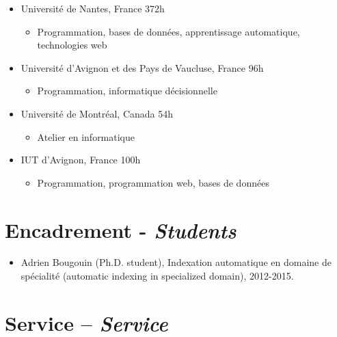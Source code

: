 \documentclass[11pt,a4paper]{moderncv}
\begin{document}
\begin{itemize}[leftmargin=0.5cm,itemsep=-0.2cm]
    \item Université de Nantes, France \hfill 372h
    \vspace*{-0.3cm}
    \begin{itemize}
        \item Programmation, bases de données, apprentissage automatique, 
              technologies web
    \end{itemize}
    \item Université d'Avignon et des Pays de Vaucluse, France \hfill 96h
    \vspace*{-0.3cm}
    \begin{itemize}
        \item Programmation, informatique décisionnelle 
    \end{itemize}
    \item Université de Montréal, Canada \hfill 54h
    \vspace*{-0.3cm}
    \begin{itemize}
        \item Atelier en informatique
    \end{itemize}
    \item IUT d'Avignon, France \hfill 100h
    \vspace*{-0.3cm}
    \begin{itemize}
        \item Programmation, programmation web, bases de données
    \end{itemize}
\end{itemize}

\section{Encadrement - \textit{Students}}

\begin{itemize}[leftmargin=0.5cm,itemsep=-0.1cm]
    \item Adrien Bougouin (Ph.D. student), Indexation automatique en domaine de 
          spécialité (automatic indexing in specialized domain), 2012-2015.
\end{itemize}

\section{Service – \textit{Service}}
\end{document}
